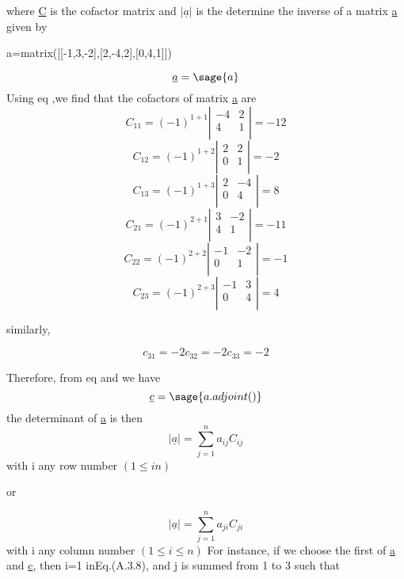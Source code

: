 \documentclass[12pt]{report}
\begin{document}
where \underline{C} is the cofactor matrix and $|\underline{a}|$ is the determine the inverse of a matrix \underline{a} given by 
\begin{sagesilent}
a=matrix([[-1,3,-2],[2,-4,2],[0,4,1]])
\end{sagesilent}
$$\underline{a} = \sage{a} $$
Using eq ,we find that the cofactors of matrix \underline{a} are 
$$ C_{11} = (-1)^{1+1} \left|\begin{array}{rr} -4 & 2 \\4 & 1\\ \end{array}\right| = -12 $$ 
$$ C_{12} = (-1)^{1+2} \left|\begin{array}{rr} 2 & 2 \\0 & 1\\ \end{array}\right| = -2 $$ 
$$ C_{13} = (-1)^{1+3} \left|\begin{array}{rr} 2 & -4 \\0 & 4\\ \end{array}\right| = 8 $$ 
$$ C_{21} = (-1)^{2+1} \left|\begin{array}{rr} 3 & -2 \\4 & 1\\ \end{array}\right| = -11 $$ 
$$ C_{22} = (-1)^{2+2} \left|\begin{array}{rr} -1 & -2 \\0 & 1\\ \end{array}\right| = -1 $$
$$ C_{23} = (-1)^{2+3} \left|\begin{array}{rr} -1 & 3 \\0 & 4\\ \end{array}\right| = 4 $$  

similarly,

$$ c_{31} = -2  c_{32} = -2  c_{33} = -2 $$

Therefore, from eq and we have 
$$ \underline{c} = \sage{a.adjoint()}$$
the determinant of \underline{a} is then 
$${|\underline{a}|}=\sum_{j=1}^{n}a_{ij}C_{ij}$$ with i any row
number $(1\leq i n)$


or


$${|\underline{a}|}=\sum_{j=1}^{n}a_{ji}C_{ji}$$ with i any column
number $(1\leq i\leq n)$
For instance, if we choose the first of \underline{a} and \underline{c}, then i=1
inEq.(A.3.8), and j is summed from 1 to 3 such that
\end{document}
